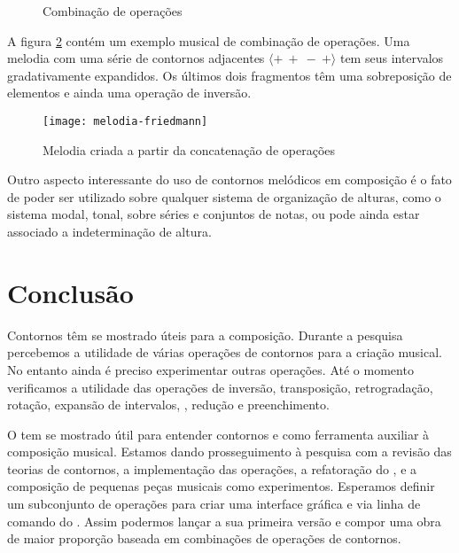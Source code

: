 \begin{figure}
  \centering
  \caption{Combinação de operações}
  \label{fig:combinacao-operacoes}
\end{figure}

A figura \ref{fig:melodia-concatenacao-operacoes} contém um exemplo
musical de combinação de operações. Uma melodia com uma série de
contornos adjacentes  $\langle+\:+\:-\:+\rangle$ tem seus
intervalos gradativamente expandidos. Os últimos dois fragmentos têm
uma sobreposição de elementos e ainda uma operação de inversão.

\begin{figure}
  \centering
  \texttt{[image: melodia-friedmann]}
  \caption{Melodia criada a partir da concatenação de operações}
  \label{fig:melodia-concatenacao-operacoes}
\end{figure}

Outro aspecto interessante do uso de contornos melódicos em composição
é o fato de poder ser utilizado sobre qualquer sistema de organização
de alturas, como o sistema modal, tonal, sobre séries e conjuntos de
notas, ou pode ainda estar associado a indeterminação de altura.

\section{Conclusão}
\label{sec:conclusao}

Contornos têm se mostrado úteis para a composição. Durante a pesquisa
percebemos a utilidade de várias operações de contornos para a criação
musical. No entanto ainda é preciso experimentar outras operações. Até
o momento verificamos a utilidade das operações de inversão,
transposição, retrogradação, rotação, expansão de intervalos,
, redução e preenchimento.

O \goiaba{} tem se mostrado útil para entender contornos e como
ferramenta auxiliar à composição musical. Estamos dando prosseguimento
à pesquisa com a revisão das teorias de contornos, a implementação das
operações, a refatoração do \goiaba{}, e a composição de pequenas
peças musicais como experimentos. Esperamos definir um subconjunto de
operações para criar uma interface gráfica e via linha de comando do
\goiaba{}. Assim podermos lançar a sua primeira versão e compor uma
obra de maior proporção baseada em combinações de operações de
contornos.

